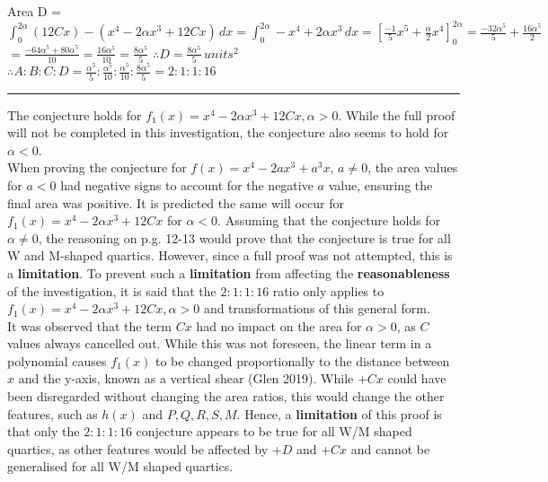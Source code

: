 \documentclass{homework}
\begin{document}
\begin{flushleft}
    Area D = $\int_0^{2\alpha} (12Cx)-(x^4-2\alpha x^3+12Cx)\, dx=\int_0^{2\alpha} -x^4+2\alpha x^3\, dx=[\frac{-1}{5}x^5+\frac{\alpha}{2}x^4]_0^{2\alpha}=\frac{-32\alpha^5}{5}+\frac{16\alpha^5}{2}$ \vspace{0.8em} \\
    $=\frac{-64\alpha^5+80\alpha^5}{10}=\frac{16\alpha^5}{10}=\frac{8\alpha^5}{5}$ \hspace{2em} $\therefore D=\frac{8\alpha^5}{5}\, units^2$ \vspace{1.8em} \\
    $\therefore A:B:C:D= \frac{\alpha^5}{5}:\frac{\alpha^5}{10}:\frac{\alpha^5}{10}:\frac{8\alpha^5}{5} =2:1:1:16 $ \\
    \rule{45em}{0.2pt}   $    $  
    \vspace{1em} \\
    The conjecture holds for $f_1(x)=x^4-2\alpha x^3+12Cx, \alpha > 0$. While the full proof will not be completed in this investigation, the conjecture also seems to hold for $\alpha<0$. \vspace{0.8em} \\
    When proving the conjecture for  $f(x)=x^4-2ax^3+a^3x,\, a\neq0$, the area values for $a<0$ had negative signs to account for the negative $a$ value, ensuring the final area was positive. It is predicted the same will occur for $f_1(x)=x^4-2\alpha x^3+12Cx$ for $\alpha<0$.
    Assuming that the conjecture holds for $\alpha\neq0$, the reasoning on p.g. 12-13 would prove that the conjecture is true for all W and M-shaped quartics. However, since a full proof was not attempted, this is a \textbf{limitation}.
    To prevent such a \textbf{limitation} from affecting the \textbf{reasonableness} of the investigation, it is said that the $2:1:1:16$ ratio only applies to $f_1(x)=x^4-2\alpha x^3+12Cx, \alpha > 0$ and transformations of this general form.
    \vspace{0.8em}\\
    It was observed that the term $Cx$ had no impact on the area for $\alpha > 0$, as $C$ values always cancelled out. While this was not foreseen, the linear term in a polynomial causes $f_1(x)$ to be changed proportionally to the distance between $x$ and the y-axis, known as a vertical shear (Glen 2019). While $+Cx$ could have been disregarded without changing the area ratios, this would change the other features, such as $h(x)$ and $P,Q,R, S,M$. Hence, a \textbf{limitation} of this proof is that only the $2:1:1:16$ conjecture appears to be true for all W/M shaped quartics, as other features would be affected by $+D$ and $+Cx$ and cannot be generalised for all W/M shaped quartics. \vspace{1.5em} \\
\end{flushleft}
\end{document}
